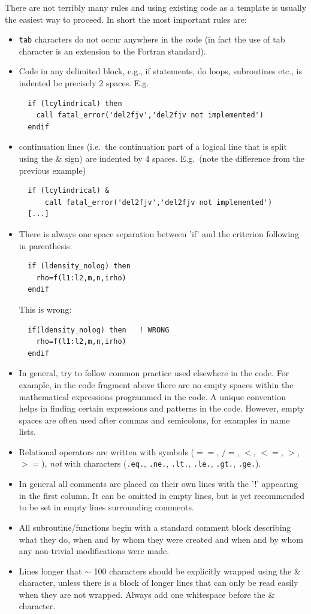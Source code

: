 \documentclass[\mydriver,12pt,twoside,notitlepage,a4paper]{article}
\makeatletter
\newcommand{\code}[1]{\texttt{#1}}
\newcommand{\cmd}{\command}
\newcommand{\command}[2][]{%
  \def\index@{#1}%
  \code{#2}%
  \ifx\index@\@empty\index{#2@\emph{#2}}%
  \else\index{#1@\emph{#1}}%
  \fi%
}
\makeatother
\begin{document}
There are not terribly many rules and using existing code as a template
is usually the easiest way to proceed.  In short the most important rules are:
\begin{itemize}
\item \cmd{tab} characters do not occur anywhere in the code (in fact the use of
tab character is an extension to the Fortran standard).
\item Code in any delimited block, e.g., if statements, do loops, subroutines
etc., is indented be precisely 2 spaces.
E.g.
\begin{Verbatim}
  if (lcylindrical) then
    call fatal_error('del2fjv','del2fjv not implemented')
  endif
\end{Verbatim}
\item continuation lines (i.e.~the continuation part of a logical line
  that is split using the \& sign) are indented by 4 spaces.
  E.g.~(note the difference from the previous example)
\begin{Verbatim}
  if (lcylindrical) &
      call fatal_error('del2fjv','del2fjv not implemented')
  [...]
\end{Verbatim}
\item There is always one space separation between 'if' and the criterion
following in parenthesis:
\begin{verbatim}
  if (ldensity_nolog) then
    rho=f(l1:l2,m,n,irho)
  endif
\end{verbatim}
This is wrong:
\begin{verbatim}
  if(ldensity_nolog) then   ! WRONG
    rho=f(l1:l2,m,n,irho)
  endif
\end{verbatim}
\item
In general, try to follow common practice used elsewhere in the code.
For example, in the code fragment above there are no empty spaces within
the mathematical expressions programmed in the code.
A unique convention helps in finding certain expressions and patterns
in the code.
However, empty spaces are often used after commas and semicolons, for
examples in name lists.
\item Relational operators are written with symbols
($==$, $/=$, $<$, $<=$, $>$, $>=$), {\it not} with characters
(\code{.eq.}, \code{.ne.}, \code{.lt.}, \code{.le.}, \code{.gt.}, \code{.ge.}).
\item In general all comments are placed on their own lines with the '!'
appearing in the first column. It can be omitted in empty lines, but is yet recommended
to be set in empty lines surrounding comments.
\item All subroutine/functions begin with a standard comment block describing
what they do, when and by whom they were created and when and by whom any
non-trivial modifications were made.
\item Lines longer that $\sim$ 100 characters should be explicitly wrapped using
  the \& character, unless there is a block of longer lines that can only
  be read easily when they are not wrapped. Always add one whitespace before
  the \& character.
\end{itemize}
\end{document}
